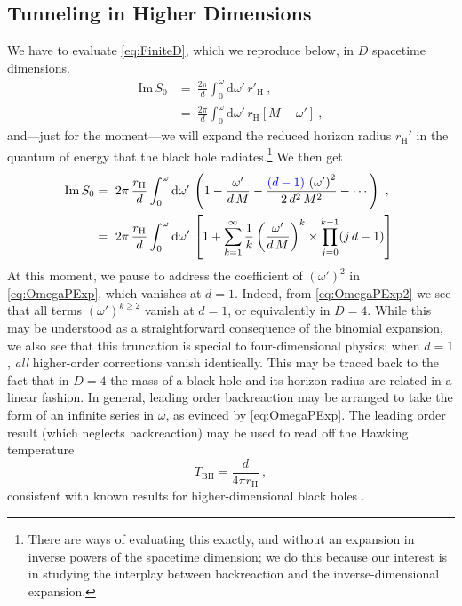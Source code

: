 \documentclass[a4paper,11pt]{article}
\newcommand{\dd}[1]{\text{d}#1 \, }
\newcommand{\im}{\text{Im} \,}
\newcommand{\rH}{r_{\text{H}}}
\begin{document}
\subsection{Tunneling in Higher Dimensions}
We have to evaluate \eqref{eq:FiniteD}, which we reproduce below, in $D$ spacetime dimensions. 
\begin{align}
\im S_0 &= \ \frac{2\pi}{d} \int_{0}^{\omega} \dd{\omega'} r'_{\text{H}} \ , \\
\label{eq:rHMomega}
&= \ \frac{2\pi}{d} \int_{0}^{\omega} \dd{\omega'} r_{\text{H}}[M-\omega']  \ ,
\end{align}
and---just for the moment---we will expand the reduced horizon radius $\rH'$ in the quantum of energy that the black hole radiates.\footnote{There are ways of evaluating this exactly, and without an expansion in inverse powers of the spacetime dimension; we do this because our interest is in studying the interplay between backreaction and the inverse-dimensional expansion.} We then get
\begin{align}
\label{eq:OmegaPExp}
\im S_0 &= \ 2\pi \, \frac{\rH}{d} \int_{0}^{\omega} \dd{\omega'} \left( 1-\frac{\omega'}{d \, M} -\frac{\textcolor{blue}{(d-1)}\, \left(\omega'\right)^2}{2 \, d^2 \, M^2} - \cdots\right) \ , \\
\label{eq:OmegaPExp2}
&= \ 2\pi \, \frac{r_{\text{H}}}{d} \int_{0}^{\omega} \dd{\omega'} \left[ 1 + \sum_{k=1}^{\infty} \frac{1}{k} \left( \frac{\omega'}{d \, M}\right)^k\times \prod_{j=0}^{k-1} (j \, d-1)  \right] \ 
\end{align}
At this moment, we pause to address the coefficient of $(\omega')^{2}$ in \eqref{eq:OmegaPExp}, which vanishes at $d = 1$. Indeed, from \eqref{eq:OmegaPExp2} we see that all terms $(\omega')^{k \geq 2}$ vanish at $d = 1$, or equivalently in $D = 4$. While this may be understood as a straightforward consequence of the binomial expansion, we also see that this truncation is special to four-dimensional physics; when $d = 1$, \emph{all} higher-order corrections vanish identically. This may be traced back to the fact that in $D = 4$ the mass of a black hole and its horizon radius are related in a linear fashion. In general, leading order backreaction may be arranged to take the form of an infinite series in $\omega$, as evinced by \eqref{eq:OmegaPExp}. The leading order result (which neglects backreaction) may be used to read off the Hawking temperature
\begin{equation}
T_{\text{BH}} = \frac{d}{4\pi \rH} \ ,
\end{equation}
consistent with known results for higher-dimensional black holes \cite{Myers:1986un}.
\end{document}
